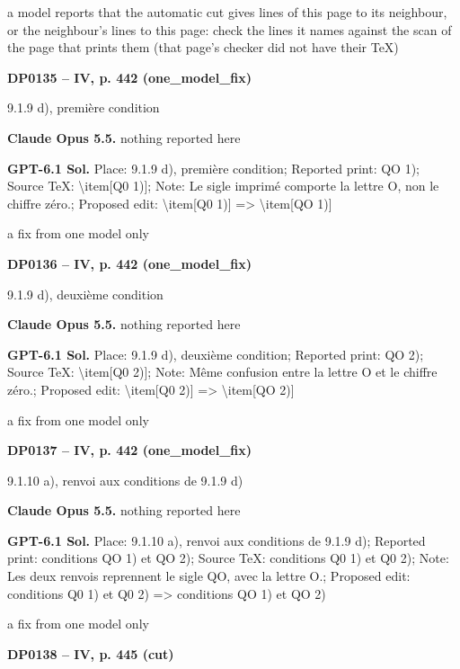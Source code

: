 a model reports that the automatic cut gives lines of this page to its neighbour, or the neighbour's lines to this page: check the lines it names against the scan of the page that prints them (that page's checker did not have their TeX)\par
\par\noindent\hypertarget{DP0135}{}\textbf{DP0135 -- IV, p. 442 (one\_model\_fix)}\par
9.1.9 d), première condition\par
\textbf{Claude Opus 5.5.} nothing reported here\par
\textbf{GPT-6.1 Sol.} Place: 9.1.9 d), première condition; Reported print: QO 1); Source TeX: \textbackslash{}item[Q0 1)]; Note: Le sigle imprimé comporte la lettre O, non le chiffre zéro.; Proposed edit: \textbackslash{}item[Q0 1)] =\allowbreak > \textbackslash{}item[QO 1)]\par
a fix from one model only\par
\par\noindent\hypertarget{DP0136}{}\textbf{DP0136 -- IV, p. 442 (one\_model\_fix)}\par
9.1.9 d), deuxième condition\par
\textbf{Claude Opus 5.5.} nothing reported here\par
\textbf{GPT-6.1 Sol.} Place: 9.1.9 d), deuxième condition; Reported print: QO 2); Source TeX: \textbackslash{}item[Q0 2)]; Note: Même confusion entre la lettre O et le chiffre zéro.; Proposed edit: \textbackslash{}item[Q0 2)] =\allowbreak > \textbackslash{}item[QO 2)]\par
a fix from one model only\par
\par\noindent\hypertarget{DP0137}{}\textbf{DP0137 -- IV, p. 442 (one\_model\_fix)}\par
9.1.10 a), renvoi aux conditions de 9.1.9 d)\par
\textbf{Claude Opus 5.5.} nothing reported here\par
\textbf{GPT-6.1 Sol.} Place: 9.1.10 a), renvoi aux conditions de 9.1.9 d); Reported print: conditions QO 1) et QO 2); Source TeX: conditions Q0 1) et Q0 2); Note: Les deux renvois reprennent le sigle QO, avec la lettre O.; Proposed edit: conditions Q0 1) et Q0 2) =\allowbreak > conditions QO 1) et QO 2)\par
a fix from one model only\par
\par\noindent\hypertarget{DP0138}{}\textbf{DP0138 -- IV, p. 445 (cut)}\par
